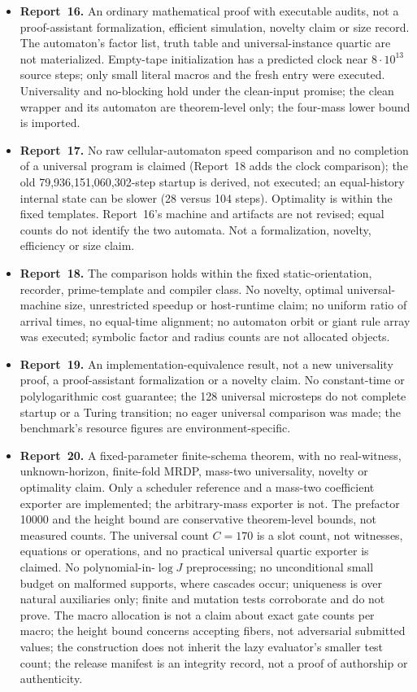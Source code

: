 \documentclass[11pt,a4paper]{article}
\numberwithin{equation}{section}
\begin{document}
\begin{itemize}
\item \textbf{Report~16.} An ordinary mathematical proof with executable audits, not a proof-assistant formalization, efficient simulation, novelty claim or size record. The automaton's factor list, truth table and universal-instance quartic are not materialized. Empty-tape initialization has a predicted clock near $8\cdot10^{13}$ source steps; only small literal macros and the fresh entry were executed. Universality and no-blocking hold under the clean-input promise; the clean wrapper and its automaton are theorem-level only; the four-mass lower bound is imported.
\item \textbf{Report~17.} No raw cellular-automaton speed comparison and no completion of a universal program is claimed (Report~18 adds the clock comparison); the old 79,936,151,060,302-step startup is derived, not executed; an equal-history internal state can be slower (28 versus 104 steps). Optimality is within the fixed templates. Report~16's machine and artifacts are not revised; equal counts do not identify the two automata. Not a formalization, novelty, efficiency or size claim.
\item \textbf{Report~18.} The comparison holds within the fixed static-orientation, recorder, prime-template and compiler class. No novelty, optimal universal-machine size, unrestricted speedup or host-runtime claim; no uniform ratio of arrival times, no equal-time alignment; no automaton orbit or giant rule array was executed; symbolic factor and radius counts are not allocated objects.
\item \textbf{Report~19.} An implementation-equivalence result, not a new universality proof, a proof-assistant formalization or a novelty claim. No constant-time or polylogarithmic cost guarantee; the 128 universal microsteps do not complete startup or a Turing transition; no eager universal comparison was made; the benchmark's resource figures are environment-specific.
\item \textbf{Report~20.} A fixed-parameter finite-schema theorem, with no real-witness, unknown-horizon, finite-fold MRDP, mass-two universality, novelty or optimality claim. Only a scheduler reference and a mass-two coefficient exporter are implemented; the arbitrary-mass exporter is not. The prefactor 10000 and the height bound are conservative theorem-level bounds, not measured counts. The universal count $C=170$ is a slot count, not witnesses, equations or operations, and no practical universal quartic exporter is claimed. No polynomial-in-$\log J$ preprocessing; no unconditional small budget on malformed supports, where cascades occur; uniqueness is over natural auxiliaries only; finite and mutation tests corroborate and do not prove. The macro allocation is not a claim about exact gate counts per macro; the height bound concerns accepting fibers, not adversarial submitted values; the construction does not inherit the lazy evaluator's smaller test count; the release manifest is an integrity record, not a proof of authorship or authenticity.

\end{itemize}
\end{document}
